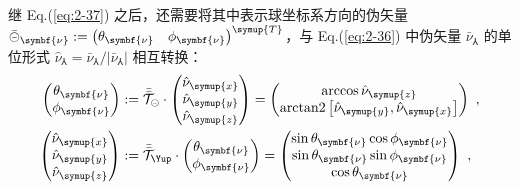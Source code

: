 继 Eq.(\ref{eq:2-37}) 之后，还需要将其中表示球坐标系方向的伪矢量 $\bar{\circleddash}_{\symbf{\nu}} := \begin{pmatrix} \theta_{\symbf{\nu}} & \phi_{\symbf{\nu}} \end{pmatrix}^{\symup{T}}$，与 Eq.(\ref{eq:2-36}) 中伪矢量 ${\bar{\nu}}_{\Yup}$ 的单位形式 ${\hat{\nu}}_{\Yup} = {\bar{\nu}}_{\Yup} \big/ \left| {\bar{\nu}}_{\Yup} \right|$ 相互转换：
\begin{subequations} \label{eq:2-38}
	\belowdisplayskip=10pt
	\begin{align}
		\begin{pmatrix} \theta_{\symbf{\nu}} \\ \phi_{\symbf{\nu}} \end{pmatrix} &:= \bar{\bar{\mathcal{T}}}_{\circleddash} \cdot \begin{pmatrix} \hat{\nu}_{{\symup{x}}} \\ \hat{\nu}_{{\symup{y}}} \\ \hat{\nu}_{{\symup{z}}} \end{pmatrix} = \begin{pmatrix} \arccos{\hat{\nu}_{{\symup{z}}}} \\ \text{arctan2}\left[\hat{\nu}_{{\symup{y}}}, \hat{\nu}_{{\symup{x}}}\right] \end{pmatrix} \label{eq:2-38a}~, \\
		\begin{pmatrix} \hat{\nu}_{{\symup{x}}} \\ \hat{\nu}_{{\symup{y}}} \\ \hat{\nu}_{{\symup{z}}} \end{pmatrix} &:= \bar{\bar{\mathcal{T}}}_{\Yup} \cdot \begin{pmatrix} \theta_{\symbf{\nu}} \\ \phi_{\symbf{\nu}} \end{pmatrix} = \begin{pmatrix} \sin{\theta_{\symbf{\nu}}} \cos{\phi_{\symbf{\nu}}} \\ \sin{\theta_{\symbf{\nu}}} \sin{\phi_{\symbf{\nu}}} \\ \cos{\theta_{\symbf{\nu}}} \end{pmatrix} \label{eq:2-38b}~,
	\end{align}
\end{subequations}
